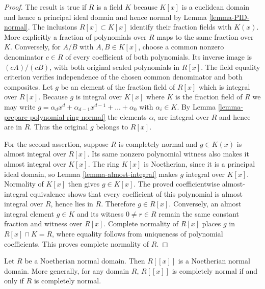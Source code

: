 \begin{proof}
The result is true if $R$ is a field $K$ because
$K[x]$ is a euclidean domain and hence a principal ideal
domain and hence normal by Lemma \ref{lemma-PID-normal}.
The inclusions $R[x]\subset K[x]$ identify their fraction fields
with $K(x)$. More explicitly a fraction of polynomials over $R$
maps to the same fraction over $K$. Conversely, for $A/B$ with
$A,B\in K[x]$, choose a common nonzero denominator $c\in R$
of every coefficient of both polynomials. Its inverse image is
$(cA)/(cB)$, with both original scaled polynomials in $R[x]$.
The field equality criterion verifies independence of the chosen
common denominator and both composites.
Let $g$ be an element of the fraction field of
$R[x]$ which is integral over $R[x]$. Because $g$
is integral over $K[x]$ where $K$ is the fraction
field of $R$ we may write $g = \alpha_d x^d + \alpha_{d-1}x^{d-1} +
\ldots + \alpha_0$ with $\alpha_i \in K$.
By Lemma \ref{lemma-prepare-polynomial-ring-normal}
the elements $\alpha_i$ are integral over $R$ and
hence are in $R$. Thus the original $g$ belongs to $R[x]$.

For the second assertion, suppose $R$ is completely normal and
$g\in K(x)$ is almost integral over $R[x]$. Its same nonzero
polynomial witness also makes it almost integral over $K[x]$.
The ring $K[x]$ is Noetherian, since it is a principal ideal
domain, so Lemma \ref{lemma-almost-integral} makes $g$ integral
over $K[x]$. Normality of $K[x]$ then gives $g\in K[x]$.
The proved coefficientwise almost-integral equivalence shows
that every coefficient of this polynomial is almost integral
over $R$, hence lies in $R$. Therefore $g\in R[x]$.
Conversely, an almost integral element $g\in K$ and its witness
$0\ne r\in R$ remain the same constant fraction and witness
over $R[x]$. Complete normality of $R[x]$ places $g$ in
$R[x]\cap K=R$, where equality follows from uniqueness of
polynomial coefficients. This proves complete normality of $R$.
\end{proof}

\begin{lemma}
\label{lemma-power-series-over-Noetherian-normal-domain}
Let $R$ be a Noetherian normal domain. Then $R[[x]]$ is
a Noetherian normal domain. More generally, for any domain $R$,
$R[[x]]$ is completely normal if and only if $R$ is completely normal.
\end{lemma}

